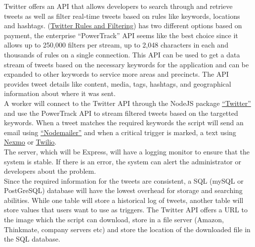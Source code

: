 \documentclass{homework}
\begin{document}
\begin{solution}
    Twitter offers an API that allows developers to search through and retrieve tweets as well as filter real-time tweets based on rules like keywords, locations and hashtags. 
    (\href{https://developer.twitter.com/en/docs/tweets/rules-and-filtering/overview/premium-operators}{Twitter Rules and Filtering}) has two different options based on payment, the enterprise ``PowerTrack'' API seems like the best choice since it allows up to 250,000 filters per stream, up to 2,048 characters in each and thousands of rules on a single connection. This API can be used to get a data stream of tweets based on the necessary keywords for the application and can be expanded to other keywords to service more areas and precincts. The API provides tweet details like content, media, tags, hashtags, and geographical information about where it was sent.\\

    A worker will connect to the Twitter API through the NodeJS package \href{https://www.npmjs.com/package/twitter}{``Twitter''} and use the PowerTrack API to stream filtered tweets based on the targetted keywords. When a tweet matches the required keywords the script will send an email using \href{https://nodemailer.com/}{``Nodemailer''} and when a critical trigger is marked, a text using \href{https://developer.nexmo.com/messaging/sms/overview}{Nexmo} or \href{https://www.twilio.com/docs/sms}{Twilio}.\\
    
    The server, which will be Express, will have a logging monitor to ensure that the system is stable. If there is an error, the system can alert the administrator or developers about the problem. \\

    Since the required information for the tweets are consistent, a SQL (mySQL or PostGreSQL) database will have the lowest overhead for storage and searching abilities. While one table will store a historical log of tweets, another table will store values that users want to use as triggers. The Twitter API offers a URL to the image which the script can download, store in a file server (Amazon, Thinkmate, company servers etc) and store the location of the downloaded file in the SQL database. 

\end{solution}
\end{document}
